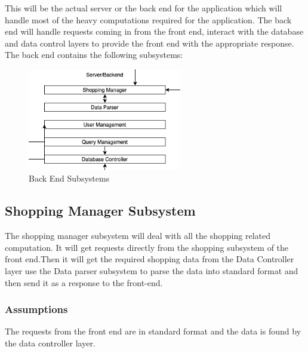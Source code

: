 This will be the actual server or the back end for the application which will handle most of the heavy computations required for the application. The back end will handle requests coming in from the front end, interact with the database and data control layers to provide the front end with the appropriate response. The back end contains the following subsystems:

\begin{figure}[h!]
	\centering
 	\includegraphics[width=0.60\textwidth]{images/Server.png}
 \caption{Back End Subsystems}
\end{figure}

\subsection{Shopping Manager Subsystem}
The shopping manager subsystem will deal with all the shopping related computation. It will get requests directly from the shopping subsystem of the front end.Then it will get the required shopping data from the Data Controller layer use the Data parser subsystem to parse the data into standard format and then send it as a response to the front-end.


\subsubsection{Assumptions}
The requests from the front end are in standard format and the data is found by the data controller layer.

